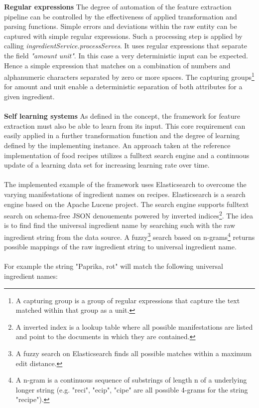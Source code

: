 \textbf{Regular expressions}
The degree of automation of the feature extraction pipeline can be controlled by the effectiveness of applied transformation and parsing functions. Simple errors and deviations within the raw entity can be captured with simple regular expressions. Such a processing step is applied by calling \textit{ingredientService.processServes}. It uses regular expressions that separate the field \textit{"amount unit"}. In this case a very deterministic input can be expected. Hence a simple expression that matches on a combination of numbers and alphanumeric characters separated by zero or more spaces. The capturing groups\footnote{A capturing group is a group of regular expressions that capture the text matched within that group as a unit.} for amount and unit enable a deterministic separation of both attributes for a given ingredient.
\\\\
\textbf{Self learning systems}
As defined in the concept, the framework for feature extraction must also be able to learn from its input. This core requirement can easily applied in a further transformation function and the degree of learning defined by the implementing instance. An approach taken at the reference implementation of food recipes utilizes a fulltext search engine and a continuous update of a learning data set for increasing learning rate over time. 
\\\\
The implemented example of the framework uses Elasticsearch to overcome the varying manifestations of ingredient names on recipes. Elasticsearch is a search engine based on the Apache Lucene project. The search engine supports fulltext search on schema-free JSON denouements powered by inverted indices\footnote{A inverted index is a lookup table where all possible manifestations are listed and point to the documents in which they are contained.}. The idea is to find find the universal ingredient name by searching such with the raw ingredient string from the data source. A fuzzy\footnote{A fuzzy search on Elasticsearch finds all possible matches within a maximum edit distance.} search based on n-grams\footnote{A n-gram is a continuous sequence of substrings of length n of a underlying longer string (e.g. "reci", "ecip", "cipe" are all possible 4-grams for the string "recipe").} returns possible mappings of the raw ingredient string to universal ingredient name. 
\\\\
For example the string "Paprika, rot" will match the following universal ingredient names:
